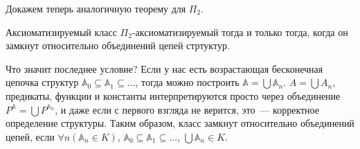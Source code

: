 Докажем теперь аналогичную теорему для $\Pi_2$.  \\ 

\begin{theorem} %
    Аксиоматизируемый класс $\Pi_2$-аксиоматизируемый тогда и только тогда, когда он замкнут относительно объединений цепей стртуктур.
\end{theorem}

\begin{remark}
    Что значит последнее условие? Если у нас есть возрастающая бесконечная цепочка структур $\mathbb{A}_0 \subseteq \mathbb{A}_1 \subseteq \ldots$, тогда можно построить $\mathbb{A} = \bigcup \mathbb{A}_n$. $A = \bigcup A_n$, предикаты, функции  и константы интерпретируются просто через объединение $P^{\mathbb{A}} = \bigcup P^{\mathbb{A}_n}$, и даже если с первого взгляда не верится, это~— корректное определение структуры. Таким образом, класс замкнут относительно объединений цепей, если $\forall n (\mathbb{A}_n \in K)$, $\mathbb{A}_0 \subseteq \mathbb{A}_1 \subseteq \ldots$, $\bigcup \mathbb{A}_n \in K$. 
\end{remark}

